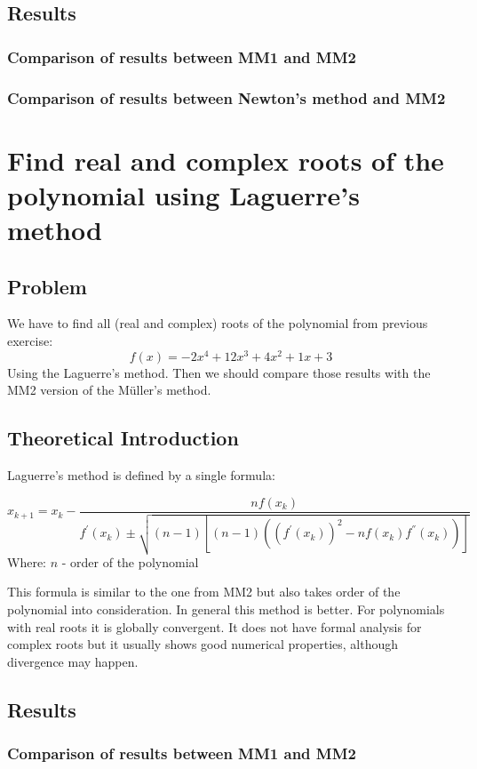 \documentclass[12pt]{report}
\begin{document}
\section{Results}

\subsection{Comparison of results between MM1 and MM2}
\subsection{Comparison of results between Newton's method and MM2}

\chapter{Find real and complex roots of the polynomial using Laguerre's method}

\section{Problem}
We have to find all (real and complex) roots of the polynomial from previous exercise:
\[ f(x) = -2x^4+12x^3+4x^2+1x+3 \]
Using the Laguerre's method. Then we should compare those results with the MM2 version of the  M{\"u}ller's method.


\section{Theoretical Introduction}
Laguerre's method is defined by a single formula:

\[ x_{k+1} = x_k - \frac{nf(x_k)}{f^{'}(x_k) \pm \sqrt{(n-1)[(n-1)( (f^{'}(x_k))^2 - nf(x_k)f^{''}(x_k) )]}} \]
Where:
$n$ - order of the polynomial

This formula is similar to the one from MM2 but also takes order of the polynomial into consideration. In general this method is better. For polynomials with real roots it is globally convergent. It does not have formal analysis for complex roots but it usually shows good numerical properties, although divergence may happen.

\section{Results}
\subsection{Comparison of results between MM1 and MM2}
\end{document}
